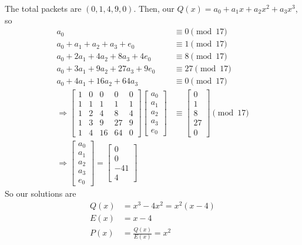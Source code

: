 \documentclass{article}
\begin{document}
The total packets are \((0, 1, 4, 9, 0)\).
Then, our \(Q(x) = a_0 + a_1 x + a_2 x^2 + a_3 x^3\), so
\begin{align}
    a_0 &\equiv 0 \pmod{17} \\
    a_0 + a_1 + a_2 + a_3 + e_0 &\equiv 1 \pmod{17} \\
    a_0 + 2 a_1 + 4 a_2 + 8 a_3 + 4 e_0 &\equiv 8 \pmod{17} \\
    a_0 + 3 a_1 + 9 a_2 + 27 a_3 + 9 e_0 &\equiv 27 \pmod{17} \\
    a_0 + 4 a_1 + 16 a_2 + 64 a_3 &\equiv 0 \pmod{17} \\
    \Rightarrow
    \begin{bmatrix}
        1 & 0 & 0 & 0 & 0 \\
        1 & 1 & 1 & 1 & 1 \\
        1 & 2 & 4 & 8 & 4 \\
        1 & 3 & 9 & 27 & 9 \\
        1 & 4 & 16 & 64 & 0
    \end{bmatrix}
    \begin{bmatrix}
        a_0 \\
        a_1 \\
        a_2 \\
        a_3 \\
        e_0
    \end{bmatrix}
    &\equiv
    \begin{bmatrix}
        0 \\
        1 \\
        8 \\
        27 \\
        0
    \end{bmatrix} \pmod{17} \\
    \Rightarrow
    \begin{bmatrix}
        a_0 \\
        a_1 \\
        a_2 \\
        a_3 \\
        e_0
    \end{bmatrix}
    =
    \begin{bmatrix}
        0 \\
        0 \\
        -4
        1 \\
        4
    \end{bmatrix}
\end{align}
So our solutions are
\begin{align}
    Q(x) &= x^3 - 4x^2 = x^2 (x - 4) \\
    E(x) &= x - 4 \\
    P(x) &= \frac{Q(x)}{E(x)} = x^2
\end{align}
\end{document}
